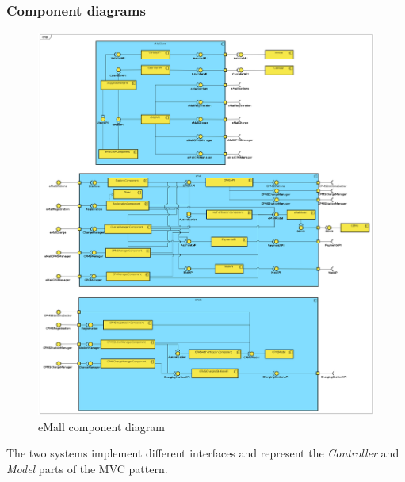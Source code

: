 \subsubsection{Component diagrams}
\begin{figure}[!h]
    \begin{center}
        \includegraphics[keepaspectratio, width=16cm]{Component/Component.png}
        \caption{eMall component diagram}
        \label{fig:eMSP-component}
    \end{center}
\end{figure}
\clearpage
The two systems implement different interfaces and represent the \textit{Controller} and \textit{Model} parts of the \ac{MVC} pattern.
\makeatletter
\let\orgdescriptionlabel\descriptionlabel
\renewcommand*{\descriptionlabel}[1]{%
    \let\orglabel\label
    \let\label\@gobble
    \phantomsection
    \edef\@currentlabel{#1\unskip}%
    \let\label\orglabel
    \orgdescriptionlabel{#1}%
}
\makeatother

